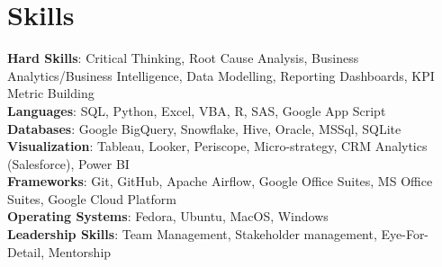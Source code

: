 \section{Skills}
  \begin{itemize}[leftmargin=0.1in, label={}]
    \normalsize{\item{
      \textbf{Hard Skills}: Critical Thinking, Root Cause Analysis, Business Analytics/Business Intelligence, Data Modelling, Reporting Dashboards, KPI Metric Building \\
      \textbf{Languages}: SQL, Python, Excel, VBA, R, SAS, Google App Script\\
      \textbf{Databases}: Google BigQuery, Snowflake, Hive, Oracle, MSSql, SQLite \\
      \textbf{Visualization}: Tableau, Looker, Periscope, Micro-strategy, CRM Analytics (Salesforce), Power BI \\
      \textbf{Frameworks}: Git, GitHub, Apache Airflow, Google Office Suites, MS Office Suites, Google Cloud Platform \\
      \textbf{Operating Systems}: Fedora, Ubuntu, MacOS, Windows \\
      \textbf{Leadership Skills}: Team Management, Stakeholder management, Eye-For-Detail, Mentorship \\
     }}
  \end{itemize}
\vspace{-10pt}
